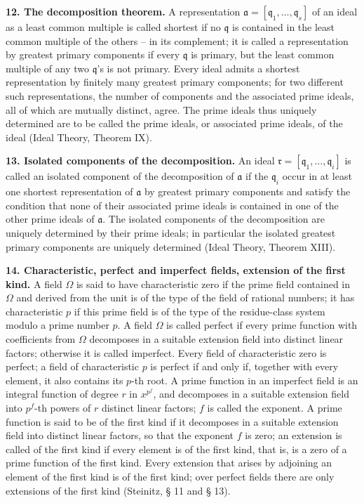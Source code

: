 \documentclass[11pt]{article}
\providecommand{\frakq}{\mathfrak q}
\providecommand{\frakr}{\mathfrak r}
\providecommand{\fraka}{\mathfrak a}
\begin{document}
\textbf{12. The decomposition theorem.} A representation $\fraka=[\frakq_1,\ldots,\frakq_s]$ of an ideal as a least common multiple is called shortest if no $\frakq$ is contained in the least common multiple of the others -- in its complement; it is called a representation by greatest primary components if every $\frakq$ is primary, but the least common multiple of any two $\frakq$'s is not primary. Every ideal admits a shortest representation by finitely many greatest primary components; for two different such representations, the number of components and the associated prime ideals, all of which are mutually distinct, agree. The prime ideals thus uniquely determined are to be called the prime ideals, or associated prime ideals, of the ideal (Ideal Theory, Theorem IX).

\textbf{13. Isolated components of the decomposition.} An ideal $\frakr=[\frakq_1,\ldots,\frakq_i]$ is called an isolated component of the decomposition of $\fraka$ if the $\frakq_i$ occur in at least one shortest representation of $\fraka$ by greatest primary components and satisfy the condition that none of their associated prime ideals is contained in one of the other prime ideals of $\fraka$. The isolated components of the decomposition are uniquely determined by their prime ideals; in particular the isolated greatest primary components are uniquely determined (Ideal Theory, Theorem XIII).

\textbf{14. Characteristic, perfect and imperfect fields, extension of the first kind.} A field $\Omega$ is said to have characteristic zero if the prime field contained in $\Omega$ and derived from the unit is of the type of the field of rational numbers; it has characteristic $p$ if this prime field is of the type of the residue-class system modulo a prime number $p$. A field $\Omega$ is called perfect if every prime function with coefficients from $\Omega$ decomposes in a suitable extension field into distinct linear factors; otherwise it is called imperfect. Every field of characteristic zero is perfect; a field of characteristic $p$ is perfect if and only if, together with every element, it also contains its $p$-th root. A prime function in an imperfect field is an integral function of degree $r$ in $x^{p^f}$, and decomposes in a suitable extension field into $p^f$-th powers of $r$ distinct linear factors; $f$ is called the exponent. A prime function is said to be of the first kind if it decomposes in a suitable extension field into distinct linear factors, so that the exponent $f$ is zero; an extension is called of the first kind if every element is of the first kind, that is, is a zero of a prime function of the first kind. Every extension that arises by adjoining an element of the first kind is of the first kind; over perfect fields there are only extensions of the first kind (Steinitz, § 11 and § 13).
\end{document}
